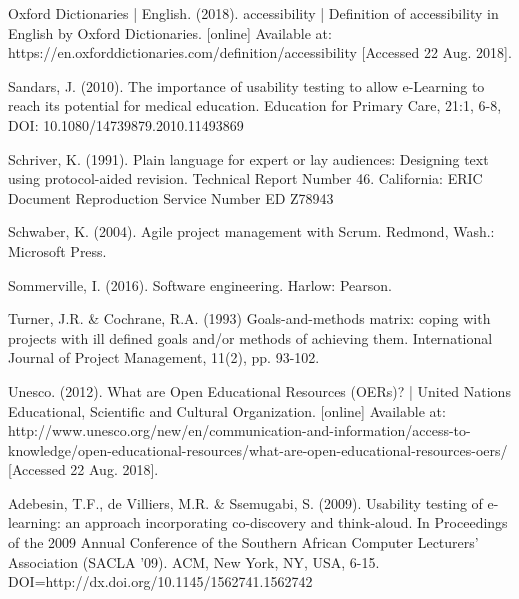 \begin{thebibliography}{69}
     Oxford Dictionaries | English. (2018). accessibility | Definition of accessibility in English by Oxford Dictionaries. [online] Available at: https://en.oxforddictionaries.com/definition/accessibility [Accessed 22 Aug. 2018].

	 Sandars, J. (2010). The importance of usability testing to allow e-Learning to reach its potential for medical education. Education for Primary Care, 21:1, 6-8, DOI: 10.1080/14739879.2010.11493869
  
	 Schriver, K. (1991). Plain language for expert or lay audiences: Designing text using protocol-aided revision. Technical Report Number 46. California: ERIC Document Reproduction Service Number ED Z78943
	
     Schwaber, K. (2004). Agile project management with Scrum. Redmond, Wash.: Microsoft Press.
    
     Sommerville, I. (2016). Software engineering. Harlow: Pearson.

     Turner, J.R. \& Cochrane, R.A. (1993) Goals-and-methods matrix: coping with projects with ill defined goals and/or methods of achieving them. International Journal of Project Management, 11(2), pp. 93-102.
  
     Unesco. (2012). What are Open Educational Resources (OERs)? | United Nations Educational, Scientific and Cultural Organization. [online] Available at: http://www.unesco.org/new/en/communication-and-information/access-to-knowledge/open-educational-resources/what-are-open-educational-resources-oers/ [Accessed 22 Aug. 2018].
 
	 Adebesin, T.F., de Villiers, M.R. \& Ssemugabi, S. (2009). Usability testing of e-learning: an approach incorporating co-discovery and think-aloud. In Proceedings of the 2009 Annual Conference of the Southern African Computer Lecturers' Association (SACLA '09). ACM, New York, NY, USA, 6-15. DOI=http://dx.doi.org/10.1145/1562741.1562742   

\end{thebibliography}


